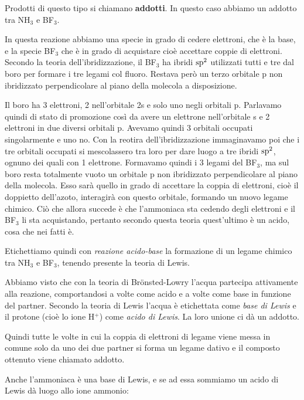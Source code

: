Prodotti di questo tipo si chiamano \textbf{addotti}. In questo caso abbiamo un addotto tra NH$_3$ e BF$_3$.

In questa reazione abbiamo una specie in grado di cedere elettroni, che è la base, e la specie BF$_3$ che è in grado di acquistare cioè accettare coppie di elettroni. Secondo la teoria dell'ibridizzazione, il BF$_3$ ha ibridi $\rm sp^2$ utilizzati tutti e tre dal boro per formare i tre legami col fluoro. Restava però un terzo orbitale p non ibridizzato perpendicolare al piano della molecola a disposizione.

Il boro ha 3 elettroni, 2 nell'orbitale 2s e solo uno negli orbitali p. Parlavamo quindi di stato di promozione così da avere un elettrone nell'orbitale s e 2 elettroni in due diversi orbitali p. Avevamo quindi 3 orbitali occupati singolarmente e uno no. Con la reotira dell'ibridizzazione immaginavamo poi che i tre orbitali occupati si mescolassero tra loro per dare luogo a tre ibridi $\rm sp^2$, ognuno dei quali con 1 elettrone. Formavamo quindi i 3 legami del BF$_3$, ma sul boro resta totalmente vuoto un orbitale p non ibridizzato perpendicolare al piano della molecola. Esso sarà quello in grado di accettare la coppia di elettroni, cioè il doppietto dell'azoto, interagirà con questo orbitale, formando un nuovo legame chimico. Ciò che allora succede è che l'ammoniaca sta cedendo degli elettroni e il BF$_3$ li sta acquistando, pertanto secondo questa teoria quest'ultimo è un acido, cosa che nei fatti è.

\vspace{0.2cm}Etichettiamo quindi con \textit{reazione acido-base} la formazione di un legame chimico tra NH$_3$ e BF$_3$, tenendo presente la teoria di Lewis.

\vspace{0.2cm}Abbiamo visto che con la teoria di  Br\"{o}nsted-Lowry l'acqua partecipa attivamente alla reazione, comportandosi a volte come acido e a volte come base in funzione del partner. Secondo la teoria di Lewis l'acqua è etichettata come \textit{base di Lewis} e il protone (cioè lo ione H$^+$) come \textit{acido di Lewis}. La loro unione ci dà un addotto.

Quindi tutte le volte in cui la coppia di elettroni di legame viene messa in comune solo da uno dei due partner si forma un legame dativo e il composto ottenuto viene chiamato addotto.

Anche l'ammoniaca è una base di Lewis, e se ad essa sommiamo un acido di Lewis dà luogo allo ione ammonio:

